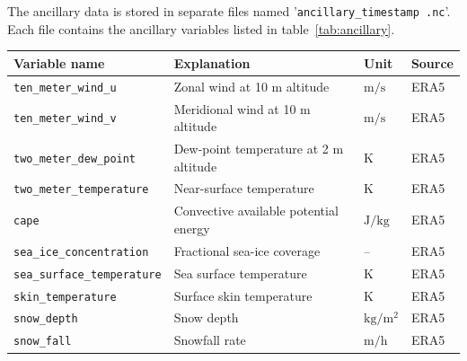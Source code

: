 \documentclass[11pt]{article}
\begin{document}
The ancillary data is stored in separate files named
'\texttt{ancillary\_\textlangle timestamp \textrangle.nc}'. Each file contains
the ancillary variables listed in table~\ref{tab:ancillary}.

\begin{table}[htbp]
	\centering
	\begin{tabular}{lp{4cm}ll}
		\toprule
		\textbf{Variable name}                       & \textbf{Explanation}                                   & \textbf{Unit}                               & \textbf{Source} \\
		\midrule
		\texttt{ten\_meter\_wind\_u}                 & Zonal wind at 10 m altitude                            & $\si{\meter \per \second}$                  & ERA5            \\
		\texttt{ten\_meter\_wind\_v}                 & Meridional wind at 10 m altitude                       & $\si{\meter \per \second}$                  & ERA5            \\
		\texttt{two\_meter\_dew\_point}              & Dew-point temperature at 2 m altitude                  & $\si{\kelvin}$                              & ERA5            \\
		\texttt{two\_meter\_temperature}             & Near-surface temperature                               & $\si{\kelvin}$                              & ERA5            \\
		\texttt{cape}                                & Convective available potential energy                  & $\si{\joule \per \kilo \gram}$              & ERA5            \\
		\texttt{sea\_ice\_concentration}             & Fractional sea-ice coverage                            & --                                          & ERA5            \\
		\texttt{sea\_surface\_temperature}           & Sea surface temperature                                & $\si{\kelvin}$                              & ERA5            \\
		\texttt{skin\_temperature}                   & Surface skin temperature                               & $\si{\kelvin}$                              & ERA5            \\
		\texttt{snow\_depth}                         & Snow depth                                             & $\si{\kilo \gram \per \meter \squared}$     & ERA5            \\
		\texttt{snow\_fall}                          & Snowfall rate                                          & $\si{\meter \per \hour}$                    & ERA5            \\

\end{tabular}
\end{table}
\end{document}
